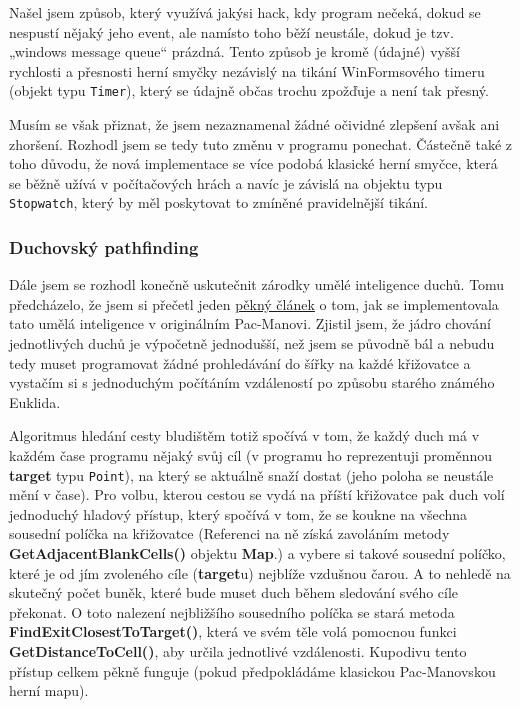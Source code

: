 \documentclass[a4]{article}
\begin{document}
Našel jsem způsob, který využívá jakýsi hack, kdy program nečeká, dokud se nespustí nějaký jeho event, ale namísto toho běží neustále, dokud je tzv. „windows message queue“ prázdná. Tento způsob je kromě (údajné) vyšší rychlosti a přesnosti herní smyčky nezávislý na tikání WinFormsového timeru (objekt typu \verb|Timer|), který se údajně občas trochu zpožďuje a není tak přesný. 

Musím se však přiznat, že jsem nezaznamenal žádné očividné zlepšení avšak ani zhoršení. Rozhodl jsem se tedy tuto změnu v programu ponechat. Částečně také z toho důvodu, že nová implementace se více podobá klasické herní smyčce, která se běžně užívá v počítačových hrách a navíc je závislá na objektu typu \verb|Stopwatch|, který by měl poskytovat to zmíněné pravidelnější tikání.

\subsubsection{Duchovský pathfinding} \label{ghostpathfinding}
Dále jsem se rozhodl konečně uskutečnit zárodky umělé inteligence duchů. Tomu předcházelo, že jsem si přečetl jeden \href{https://www.gamedeveloper.com/design/the-pac-man-dossier}{pěkný článek} o tom, jak se implementovala tato umělá inteligence v originálním Pac-Manovi. Zjistil jsem, že jádro chování jednotlivých duchů je výpočetně jednodušší, než jsem se původně bál a nebudu tedy muset programovat žádné prohledávání do šířky na každé křižovatce a vystačím si s jednoduchým počítáním vzdáleností po způsobu starého známého Euklida. 

Algoritmus hledání cesty bludištěm totiž spočívá v tom, že každý duch má v každém čase programu nějaký svůj cíl (v programu ho reprezentuji proměnnou \textbf{target} typu \verb|Point|), na který se aktuálně snaží dostat (jeho poloha se neustále mění v čase). Pro volbu, kterou cestou se vydá na příští křižovatce pak duch volí jednoduchý hladový přístup, který spočívá v tom, že se koukne na všechna sousední políčka na křižovatce (Referenci na ně získá zavoláním metody \textbf{GetAdjacentBlankCells()} objektu \textbf{Map}.) a vybere si takové sousední políčko, které je od jím zvoleného cíle (\textbf{target}u) nejblíže vzdušnou čarou. A to nehledě na skutečný počet buněk, které bude muset duch během sledování svého cíle překonat. O toto nalezení nejbližšího sousedního políčka se stará metoda \textbf{FindExitClosestToTarget()}, která ve svém těle volá pomocnou funkci \textbf{GetDistanceToCell()}, aby určila jednotlivé vzdálenosti. Kupodivu tento přístup celkem pěkně funguje (pokud předpokládáme klasickou Pac-Manovskou herní mapu).
\end{document}
